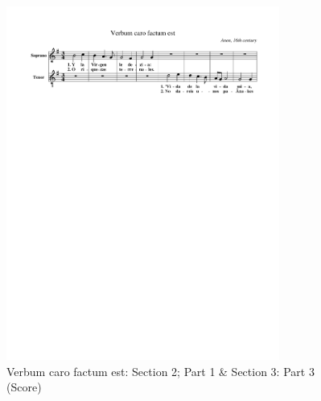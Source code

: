\vspace{-1.50cm}
\begin{figure}[H]
  \begin{center}
    \includegraphics[width=0.8\textwidth, clip=true, trim = 18mm 210mm 16mm 0mm]{img/verbum_s2_p1_s3_p3.pdf}
    \caption{Verbum caro factum est: Section 2; Part 1 \& Section 3: Part 3 (Score)}
    \label{fig:verbum_s2_p1_s3_p3}
  \end{center}
\end{figure}
